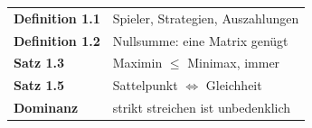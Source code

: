 \begin{merksatz}
\begin{center}
\renewcommand{\arraystretch}{1.5}
\begin{tabular}{@{}P{3.0cm}P{5.6cm}@{}}
\toprule
\textbf{Definition 1.1} & Spieler, Strategien, Auszahlungen\\
\textbf{Definition 1.2} & Nullsumme: eine Matrix genügt\\
\textbf{Satz 1.3} & Maximin $\le$ Minimax, immer\\
\textbf{Satz 1.5} & Sattelpunkt $\iff$ Gleichheit\\
\textbf{Dominanz} & strikt streichen ist unbedenklich\\
\bottomrule
\end{tabular}
\end{center}

\begin{center}
\begin{minipage}{0.88\textwidth}
\end{minipage}
\end{center}
\end{merksatz}
